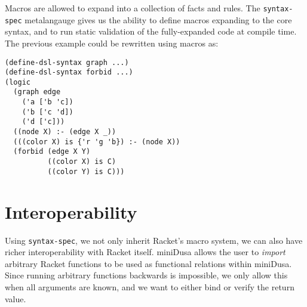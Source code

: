 \documentclass[dvipsnames,sigplan,screen,review,anonymous,acmthm,nonacm]{acmart}
\begin{document}
Macros are allowed to expand into a collection of facts and rules. The
\texttt{syntax-spec} metalangauge gives us the ability to define macros
expanding to the core syntax, and to run static validation of the fully-expanded
code at compile time. The previous example could be rewritten using macros as:
\begin{verbatim}
(define-dsl-syntax graph ...)
(define-dsl-syntax forbid ...)
(logic
  (graph edge
    ('a ['b 'c])
    ('b ['c 'd])
    ('d ['c]))
  ((node X) :- (edge X _))
  (((color X) is {'r 'g 'b}) :- (node X))
  (forbid (edge X Y)
          ((color X) is C)
          ((color Y) is C)))
\end{verbatim}

\section{Interoperability}

Using \texttt{syntax-spec}, we not only inherit Racket's macro system, we can
also have richer interoperability with Racket itself. miniDusa allows the user
to \emph{import} arbitrary Racket functions to be used as functional relations
within miniDusa. Since running arbitrary functions backwards is impossible, we
only allow this when all arguments are known, and we want to either bind or
verify the return value.







\end{document}
